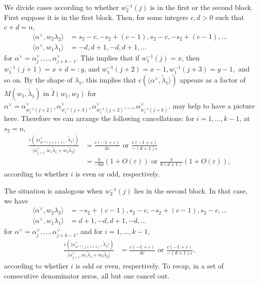\documentclass[11pt]{amsart}
\numberwithin{theorem}{section}
\numberwithin{equation}{section}
\theoremstyle{remark}
\theoremstyle{definition}
\begin{document}
{We divide cases according to whether $w_2^{-1}(j)$ is in the first or the second block. First suppose it is in the first block. Then, for some integers $c,d>0$ such that $c+d=n$,
\begin{align*}
\langle \alpha^\vee, w_2\lambda_2\rangle &= s_2-c, -s_2+(c-1), s_2-c, -s_2+(c-1), \ldots \\
\langle \alpha^\vee, w_1\lambda_1\rangle &= -d, d+1, -d, d+1,\ldots
\end{align*}
for $\alpha^\vee = \alpha^\vee_j,\ldots,\alpha^\vee_{j+k-1}$. This implies that if $w_1^{-1}(j) = x$, then $w_1^{-1}(j+1) = x+d=:y$, and $w_1^{-1}(j+2) = x-1, w_1^{-1}(j+3)= y-1,$ and so on. By the shape of $\lambda_1$, this implies that $c(\langle \alpha^\vee,\tilde\lambda_1 \rangle)$ appears as a factor of $M(w_1,\tilde\lambda_1)$ in $\tilde I(w_1,w_2)$ for $\alpha^\vee = \alpha^\vee_{w_1^{-1}(j+2)}, \alpha^\vee_{w_1^{-1}(j+3)},\alpha^\vee_{w_1^{-1}(j+2)},\ldots,\alpha^\vee_{w_1^{-1}(j+k)}$. {\color{red} may help to have a picture here.} Therefore we can arrange the following cancellations: for $i=1,\ldots,k-1$, at $s_2=n$,
\begin{align*}
\frac{c(\langle \alpha^\vee_{w^{-1}(j+i+1)},\tilde\lambda_1\rangle)}{\langle \alpha^\vee_{j+i},w_1\tilde\lambda_1+ w_2\tilde\lambda_2\rangle} &= \frac{c(-1+\varepsilon)}{d\varepsilon} \mbox{ or } \frac{c(-1+\varepsilon)}{-(d+1)\varepsilon} \\
&= \frac{\pi}{-6d}(1+O(\varepsilon)) \mbox{ or } \frac{\pi}{6(d+1)}(1+O(\varepsilon)),
\end{align*}
according to whether $i$ is even or odd, respectively.

The situation is analogous when $w^{-1}_2(j)$ lies in the second block. In that case, we have
\begin{align*}
\langle \alpha^\vee, w_2\lambda_2\rangle &= -s_2+(c-1), s_2-c, -s_2+(c-1), s_2-c, \ldots \\
\langle \alpha^\vee, w_1\lambda_1\rangle &= d+1,-d,d+1,-d,\ldots
\end{align*}
for $\alpha^\vee = \alpha^\vee_j,\ldots,\alpha^\vee_{j+k-1}$, and for $i=1,\ldots,k-1,$
\begin{align*}
\frac{c(\langle \alpha^\vee_{w^{-1}(j+i+1)},\tilde\lambda_1\rangle)}{\langle \alpha^\vee_{j+i},w_1\tilde\lambda_1+ w_2\tilde\lambda_2\rangle} &= \frac{c(-1+\varepsilon)}{d\varepsilon} \mbox{ or } \frac{c(-1+\varepsilon)}{-(d+1)\varepsilon},
\end{align*}
according to whether $i$ is odd or even, respectively. To recap, in a set of consecutive denominator zeros, all but one cancel out.

}
\end{document}
